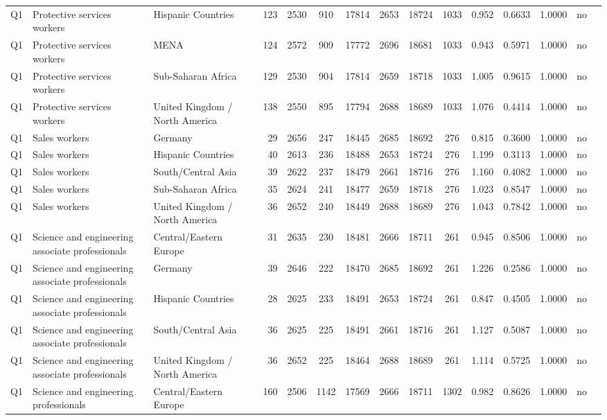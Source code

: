 \begin{longtable}{lllrcccccccccll}
Q1 & Protective services workers & Hispanic Countries & 123 & 2530 & 910 & 17814 & 2653 & 18724 & 1033 & 0.952 & 0.6633 & 1.0000 & no \\
Q1 & Protective services workers & MENA & 124 & 2572 & 909 & 17772 & 2696 & 18681 & 1033 & 0.943 & 0.5971 & 1.0000 & no \\
Q1 & Protective services workers & Sub-Saharan Africa & 129 & 2530 & 904 & 17814 & 2659 & 18718 & 1033 & 1.005 & 0.9615 & 1.0000 & no \\
Q1 & Protective services workers & United Kingdom / North America & 138 & 2550 & 895 & 17794 & 2688 & 18689 & 1033 & 1.076 & 0.4414 & 1.0000 & no \\
Q1 & Sales workers & Germany & 29 & 2656 & 247 & 18445 & 2685 & 18692 & 276 & 0.815 & 0.3600 & 1.0000 & no \\
Q1 & Sales workers & Hispanic Countries & 40 & 2613 & 236 & 18488 & 2653 & 18724 & 276 & 1.199 & 0.3113 & 1.0000 & no \\
Q1 & Sales workers & South/Central Asia & 39 & 2622 & 237 & 18479 & 2661 & 18716 & 276 & 1.160 & 0.4082 & 1.0000 & no \\
Q1 & Sales workers & Sub-Saharan Africa & 35 & 2624 & 241 & 18477 & 2659 & 18718 & 276 & 1.023 & 0.8547 & 1.0000 & no \\
Q1 & Sales workers & United Kingdom / North America & 36 & 2652 & 240 & 18449 & 2688 & 18689 & 276 & 1.043 & 0.7842 & 1.0000 & no \\
Q1 & Science and engineering associate professionals & Central/Eastern Europe & 31 & 2635 & 230 & 18481 & 2666 & 18711 & 261 & 0.945 & 0.8506 & 1.0000 & no \\
Q1 & Science and engineering associate professionals & Germany & 39 & 2646 & 222 & 18470 & 2685 & 18692 & 261 & 1.226 & 0.2586 & 1.0000 & no \\
Q1 & Science and engineering associate professionals & Hispanic Countries & 28 & 2625 & 233 & 18491 & 2653 & 18724 & 261 & 0.847 & 0.4505 & 1.0000 & no \\
Q1 & Science and engineering associate professionals & South/Central Asia & 36 & 2625 & 225 & 18491 & 2661 & 18716 & 261 & 1.127 & 0.5087 & 1.0000 & no \\
Q1 & Science and engineering associate professionals & United Kingdom / North America & 36 & 2652 & 225 & 18464 & 2688 & 18689 & 261 & 1.114 & 0.5725 & 1.0000 & no \\
Q1 & Science and engineering professionals & Central/Eastern Europe & 160 & 2506 & 1142 & 17569 & 2666 & 18711 & 1302 & 0.982 & 0.8626 & 1.0000 & no \\

\end{longtable}
